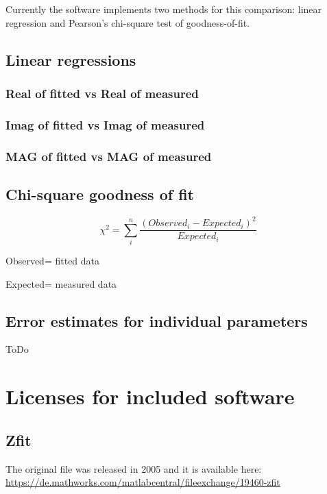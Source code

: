 \documentclass[10pt,a4paper,oneside]{book}
\begin{document}
Currently the software implements two methods for this comparison: linear regression and Pearson's chi-square test of goodness-of-fit.


\section{Linear regressions}



\subsection{Real of fitted vs Real of measured}

\subsection{Imag of fitted vs Imag of measured}

\subsection{MAG of fitted vs MAG of measured}

\section{Chi-square goodness of fit}

\[ \chi^2 = \sum_i^n{\dfrac{(Observed_i-Expected_i)^2}{Expected_i}} \]

Observed= fitted data

Expected= measured data

\section{Error estimates for individual parameters}

ToDo


\newpage{}
\chapter{Licenses for included software}

\section{Zfit}

The original file was released in 2005 and it is available here:\\

\url{https://de.mathworks.com/matlabcentral/fileexchange/19460-zfit}
\end{document}
